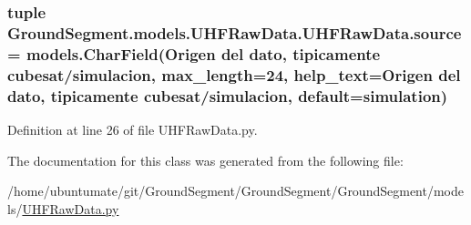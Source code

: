 \subsubsection[{source}]{\setlength{\rightskip}{0pt plus 5cm}tuple Ground\+Segment.\+models.\+U\+H\+F\+Raw\+Data.\+U\+H\+F\+Raw\+Data.\+source = models.\+Char\+Field(\textquotesingle{}Origen del dato, tipicamente cubesat/simulacion\textquotesingle{}, max\+\_\+length=24, help\+\_\+text=\textquotesingle{}Origen del dato, tipicamente cubesat/simulacion\textquotesingle{}, default=\textquotesingle{}simulation\textquotesingle{})\hspace{0.3cm}{\ttfamily [static]}}\label{class_ground_segment_1_1models_1_1_u_h_f_raw_data_1_1_u_h_f_raw_data_af793b6af185be9c8f4895d2600959b3e}


Definition at line 26 of file U\+H\+F\+Raw\+Data.\+py.



The documentation for this class was generated from the following file\+:\begin{DoxyCompactItemize}
\item 
/home/ubuntumate/git/\+Ground\+Segment/\+Ground\+Segment/\+Ground\+Segment/models/\hyperlink{_u_h_f_raw_data_8py}{U\+H\+F\+Raw\+Data.\+py}\end{DoxyCompactItemize}
